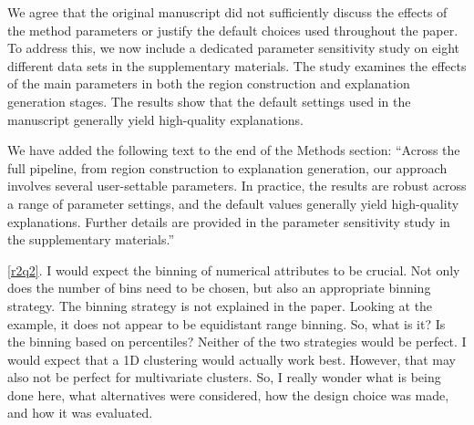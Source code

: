\documentclass[11pt]{article}
\newcounter{rtaskno}
\newcommand{\rtask}[1]{\refstepcounter{rtaskno}\label{#1}}
\newcommand{\reviewc}[2]{\begin{leftbar}\noindent\rtask{#1}\ref{#1}. #2\end{leftbar}\vspace*{-4mm}}
\newcommand{\answer}[1]{\noindent #1\par\vspace{2mm}}
\newlength{\leftbarwidth}
\newlength{\leftbarsep}
\renewenvironment{leftbar}{%
    \def\FrameCommand{{\color{black}{\vrule width \leftbarwidth\relax\hspace {\leftbarsep}}}}%
    \MakeFramed {\advance \hsize -\width \FrameRestore }%
}{\endMakeFramed}
\begin{document}
\answer{We agree that the original manuscript did not sufficiently discuss the effects of the method parameters or justify the default choices used throughout the paper. To address this, we now include a dedicated parameter sensitivity study on eight different data sets in the supplementary materials. The study examines the effects of the main parameters in both the region construction and explanation generation stages. The results show that the default settings used in the manuscript generally yield high-quality explanations.

We have added the following text to the end of the Methods section: ``Across the full pipeline, from region construction to explanation generation, our approach involves several user-settable parameters. In practice, the results are robust across a range of parameter settings, and the default values generally yield high-quality explanations. Further details are provided in the parameter sensitivity study in the supplementary materials.''
}


\reviewc{r2q2}{I would expect the binning of numerical attributes to be crucial. Not only does the number of bins need to be chosen, but also an appropriate binning strategy. The binning strategy is not explained in the paper. Looking at the example, it does not appear to be equidistant range binning. So, what is it? Is the binning based on percentiles? Neither of the two strategies would be perfect. I would expect that a 1D clustering would actually work best. However, that may also not be perfect for multivariate clusters. So, I really wonder what is being done here, what alternatives were considered, how the design choice was made, and how it was evaluated.}
\end{document}
